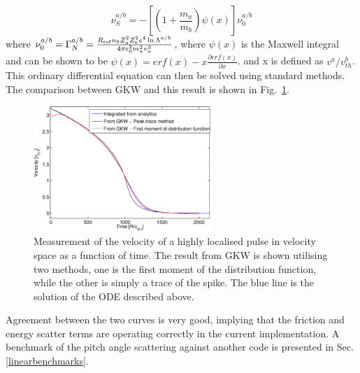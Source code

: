 \begin{equation}
\nu^{a/b}_{S} = - \left[ (1 + \frac{m_{a}}{m_{b}})\psi(x)\right]\nu_{0}^{a/b}
\end{equation}
where $\nu_{0}^{a/b}=\Gamma^{a/b}_N = {R_{\rm ref} n_b Z_a^2 Z_b^2 e^4 \ln \Lambda^{a/b} \over 4 \pi \epsilon_0^2 m_a^2 v_{a}^3} $,
where $\psi(x)$ is the Maxwell integral and can be shown to be $\psi(x) = erf(x) - x \frac{\partial erf(x)}{\partial x}$.  
and x is defined as $v^{a}/v_{th}^{b}$.  This ordinary differential equation can then be solved using standard methods.  The comparison between
GKW and this result is shown in Fig.~\ref{slowdown}.
\begin{figure}[h!]
\begin{center}
\includegraphics[width=0.60\textwidth]{../benchmarks/collisions/SlowingDownComparison2.eps}
\caption{Measurement of the velocity of a highly localised pulse in velocity space as a function of time.  The result from GKW is shown
utilising two methods, one is the first moment of the distribution function, while the other is simply a trace of the spike.  The blue line is 
the solution of the ODE described above.}
\label{slowdown}
\end{center}
\end{figure} 
Agreement between the two curves is very good, implying that the friction and energy scatter terms are operating correctly
in the current implementation.  A benchmark of the pitch angle scattering against another code is presented in Sec. \ref{linearbenchmarks}.

